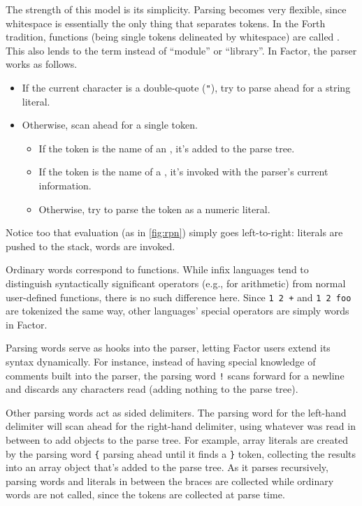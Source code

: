 The strength of this model is its simplicity.  Parsing becomes very flexible,
since whitespace is essentially the only thing that separates tokens.  In the
Forth tradition, functions (being single tokens delineated by whitespace) are
called .  This also lends to the term  instead of
``module'' or ``library''.   In Factor, the parser works as follows.
\begin{itemize}
  \item If the current character is a double-quote (\lstinline|"|), try to
        parse ahead for a string literal.
  \item Otherwise, scan ahead for a single token.
        \begin{itemize}
          \item If the token is the name of an , it's added
                to the parse tree.
          \item If the token is the name of a , it's invoked
                with the parser's current information.
          \item Otherwise, try to parse the token as a numeric literal.
        \end{itemize}
\end{itemize}
Notice too that evaluation (as in \vref{fig:rpn}) simply goes left-to-right:
literals are pushed to the stack, words are invoked.

Ordinary words correspond to functions.  While infix languages tend to
distinguish syntactically significant operators (e.g., for arithmetic) from
normal user-defined functions, there is no such difference here.  Since
\lstinline|1 2 +| and \lstinline|1 2 foo| are tokenized the same way, other
languages' special operators are simply words in Factor.


Parsing words serve as hooks into the parser, letting Factor users extend its
syntax dynamically.  For instance, instead of having special knowledge of
comments built into the parser, the parsing word \lstinline|!| scans forward
for a newline and discards any characters read (adding nothing to the parse
tree).

Other parsing words act as sided delimiters.  The parsing word for the
left-hand delimiter will scan ahead for the right-hand delimiter, using
whatever was read in between to add objects to the parse tree.  For example,
array literals are created by the parsing word \lstinline|{| parsing ahead
until it finds a \lstinline|}| token, collecting the results into an array
object that's added to the parse tree.  As it parses recursively, parsing words
and literals in between the braces are collected while ordinary words are not
called, since the tokens are collected at parse time.

